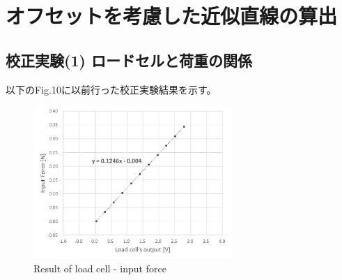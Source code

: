 \documentclass[twocolumn,a4j]{jsarticle}
\begin{document}
\newpage

\section{オフセットを考慮した近似直線の算出}

\subsection{校正実験(1) ロードセルと荷重の関係}
以下のFig.10に以前行った校正実験結果を示す。
\begin{figure}[htbp]
    \footnotesize
    \begin{center}
        \includegraphics[width=75mm]{../images/calibration_1.png}
        \caption{Result of load cell - input force}
    \end{center}
\end{figure}
\end{document}
